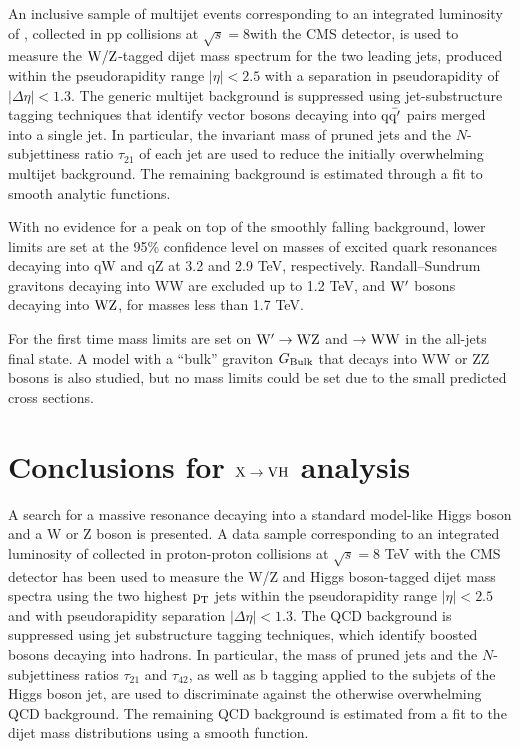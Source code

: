An inclusive sample of multijet events corresponding to an integrated
luminosity of \intlumi, collected in pp collisions at
$\sqrt{s}=8$\TeVcc with the CMS detector, is used to measure the
${\rm W}/{\rm Z}$-tagged dijet mass spectrum for the two leading jets,
produced within the pseudorapidity range $|{\eta}| < 2.5$ with a
separation in pseudorapidity of $|{\Delta\eta}| < 1.3$. The generic
multijet background is suppressed using jet-substructure tagging
techniques that identify vector bosons decaying into ${\rm q\bar{q'}}$ pairs
merged into a single jet. In particular, the invariant mass of pruned
jets and the $N$-subjettiness ratio $\tau_{21}$ of each jet are used
to reduce the initially overwhelming multijet background. The
remaining background is estimated through a fit to smooth analytic
functions. 

With no evidence for a peak on top of the smoothly falling
background, lower limits are set at the 95\% confidence level on
masses of excited quark resonances decaying into qW and qZ at 3.2 and
2.9 TeV, respectively. Randall--Sundrum gravitons \GRS decaying into
WW are excluded up to 1.2 TeV, and $\mathrm{W}^{\prime}$ bosons decaying into
${\rm W}{\rm Z}$, for masses less than 1.7 TeV.  

For the first time mass
limits are set on $\mathrm{W}^{\prime}\to {\rm W}{\rm Z}$ and \GRS $\to {\rm W}{\rm W}$ in the
all-jets final state. 
A model with a ``bulk'' graviton $G_\mathrm{Bulk}$ that decays into
WW or ZZ bosons is also studied, but no mass limits could be set due
to the small predicted cross sections.

\section{Conclusions for ${\rm X \to VH}$ analysis}
A search for a massive resonance decaying 
into a standard model-like Higgs boson and a W or Z boson is presented.
A data sample corresponding to an integrated luminosity of \intlumi
collected in proton-proton 
collisions at $\sqrt{s}=8$ TeV with the CMS detector
has been used to measure the W/Z and Higgs boson-tagged 
dijet mass spectra
using the two highest $\mathrm{p_{T}}$ jets within the pseudorapidity range $|\eta| <
2.5$ and with pseudorapidity separation $|\Delta\eta| < 1.3$.  The QCD
background is suppressed using 
 jet substructure tagging techniques,
which identify boosted bosons decaying into hadrons.  In particular, 
the mass of pruned jets and the $N$-subjettiness ratios
$\tau_{21}$ and $\tau_{42}$, as well as b tagging applied to the subjets
of the Higgs boson jet, are used to discriminate
against the otherwise overwhelming QCD background.  The remaining QCD
background is estimated from a fit to the dijet mass distributions using a smooth function. 


